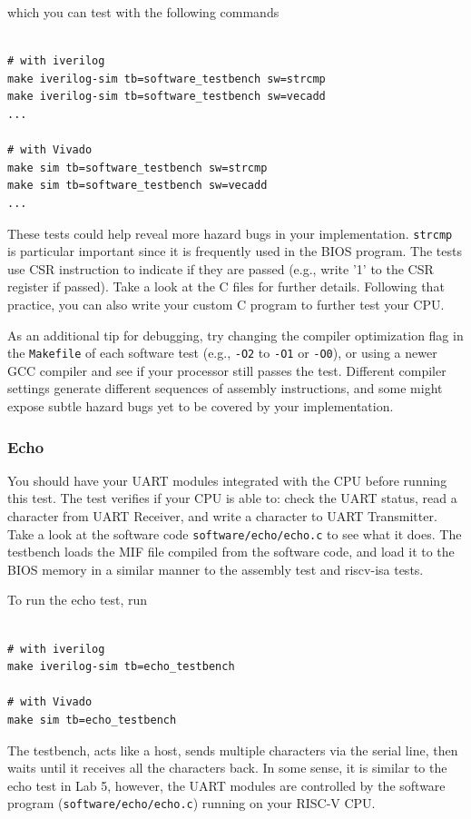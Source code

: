 \documentclass[11pt]{article}
\begin{document}
which you can test with the following commands

\begin{verbatim}

# with iverilog
make iverilog-sim tb=software_testbench sw=strcmp
make iverilog-sim tb=software_testbench sw=vecadd
...

# with Vivado
make sim tb=software_testbench sw=strcmp
make sim tb=software_testbench sw=vecadd
...

\end{verbatim}

These tests could help reveal more hazard bugs in your implementation. \texttt{strcmp} is particular important since it is frequently used in the BIOS program. The tests use CSR instruction to indicate if they are passed (e.g., write '1' to the CSR register if passed). Take a look at the C files for further details. Following that practice, you can also write your custom C program to further test your CPU.

As an additional tip for debugging, try changing the compiler optimization flag in the \verb|Makefile| of each software test (e.g., \texttt{-O2} to \texttt{-O1} or \texttt{-O0}), or using a newer GCC compiler and see if your processor still passes the test. Different compiler settings generate different sequences of assembly instructions, and some might expose subtle hazard bugs yet to be covered by your implementation.

\subsubsection{Echo}
You should have your UART modules integrated with the CPU before running this test. The test verifies if your CPU is able to: check the UART status, read a character from UART Receiver, and write a character to UART Transmitter. Take a look at the software code \verb|software/echo/echo.c| to see what it does. The testbench loads the MIF file compiled from the software code, and load it to the BIOS memory in a similar manner to the assembly test and riscv-isa tests.

To run the echo test, run

\begin{verbatim}

# with iverilog
make iverilog-sim tb=echo_testbench

# with Vivado
make sim tb=echo_testbench
\end{verbatim}

The testbench, acts like a host, sends multiple characters via the serial line, then waits until it receives all the characters back. In some sense, it is similar to the echo test in Lab 5, however, the UART modules are controlled by the software program (\verb|software/echo/echo.c|) running on your RISC-V CPU.
\end{document}

